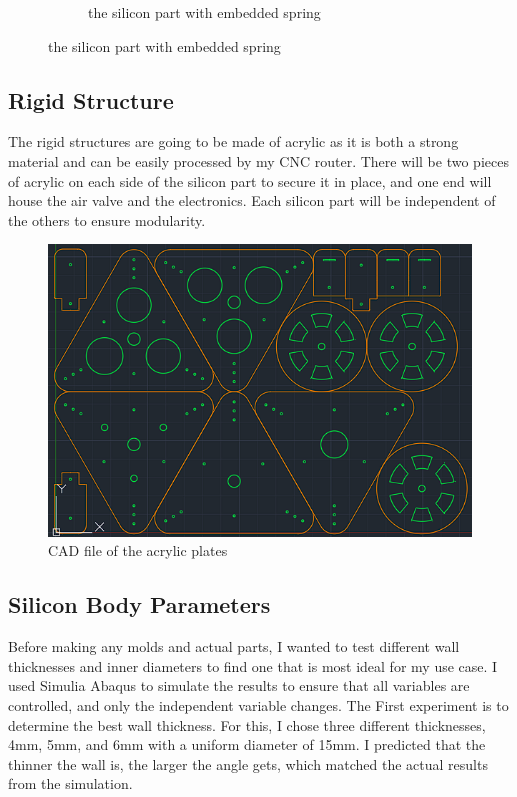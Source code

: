 \documentclass[twoside, 11pt]{article}
\begin{document}
\begin{figure}[H]
\begin{subfigure}[t]{0.33\linewidth}
		\caption{the silicon part with embedded spring}
	\end{subfigure}
\end{figure}

\subsection{Rigid Structure}
The rigid structures are going to be made of acrylic as it is both a strong material and can be easily processed by my CNC router. There will be two pieces of acrylic on each side of the silicon part to secure it in place, and one end will house the air valve and the electronics. Each silicon part will be independent of the others to ensure modularity.

\begin{figure} [H]
	\centering
	\includegraphics[scale=0.4]{acrylic_plate_cad}
	\caption{CAD file of the acrylic plates}
\end{figure}

\subsection{Silicon Body Parameters}
Before making any molds and actual parts, I wanted to test different wall thicknesses and inner diameters to find one that is most ideal for my use case. I used Simulia Abaqus to simulate the results to ensure that all variables are controlled, and only the independent variable changes. The First experiment is to determine the best wall thickness. For this, I chose three different thicknesses, 4mm, 5mm, and 6mm with a uniform diameter of 15mm. I predicted that the thinner the wall is, the larger the angle gets, which matched the actual results from the simulation.
\end{document}
